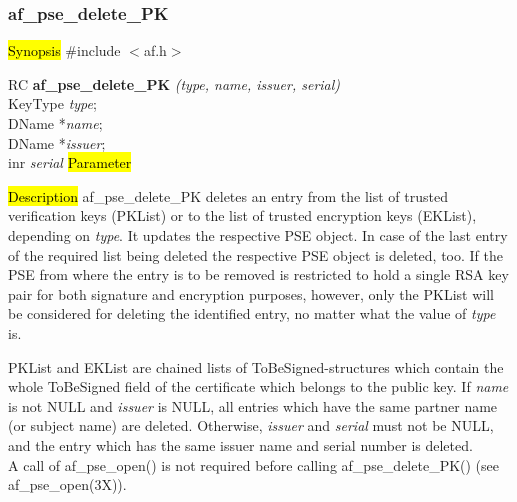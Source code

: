 \subsubsection{af\_pse\_delete\_PK}
\label{af_del_PK}
\hl{Synopsis}
\#include $<$af.h$>$ 

RC {\bf af\_pse\_delete\_PK} {\em (type, name, issuer, serial)} \\
KeyType {\em type}; \\
DName *{\em name}; \\
DName *{\em issuer}; \\
inr {\em serial}
\hl{Parameter}




\hl{Description}
af\_pse\_delete\_PK deletes an entry from the list of trusted 
verification keys (PKList) or to the list of trusted encryption keys (EKList), depending
on {\em type}. It updates the respective PSE object. In case of the last entry of the required
list being deleted the respective PSE object is deleted, too.
If the PSE from where the entry is to be removed is restricted to hold a single RSA key pair
for both signature and encryption purposes, however, only the PKList will be considered for deleting the identified entry,
no matter what the value of {\em type} is.

PKList and EKList are chained lists of ToBeSigned-structures which contain the
whole ToBeSigned field of the certificate which belongs to the public key. If 
{\em name} is not NULL and {\em issuer} is NULL, all entries which have the same partner name (or
subject name) are deleted. Otherwise, {\em issuer} and {\em serial} must not
be NULL, and the entry which has the same issuer name and serial number is
deleted.  
\\ [1em]
A call of af\_pse\_open() is not required before calling af\_pse\_delete\_PK()
(see af\_pse\_open(3X)).

